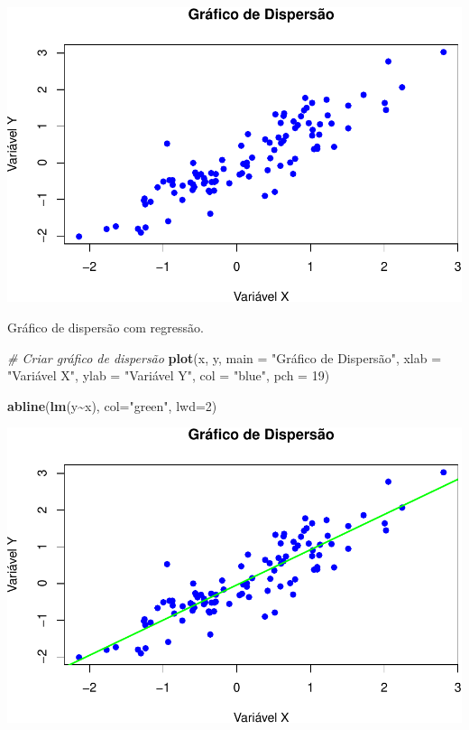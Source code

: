\documentclass[
]{book}
\newenvironment{Shaded}{\begin{snugshade}}{\end{snugshade}}
\newcommand{\AttributeTok}[1]{\textcolor[rgb]{0.13,0.29,0.53}{#1}}
\newcommand{\CommentTok}[1]{\textcolor[rgb]{0.56,0.35,0.01}{\textit{#1}}}
\newcommand{\DecValTok}[1]{\textcolor[rgb]{0.00,0.00,0.81}{#1}}
\newcommand{\FunctionTok}[1]{\textcolor[rgb]{0.13,0.29,0.53}{\textbf{#1}}}
\newcommand{\NormalTok}[1]{#1}
\newcommand{\SpecialCharTok}[1]{\textcolor[rgb]{0.81,0.36,0.00}{\textbf{#1}}}
\newcommand{\StringTok}[1]{\textcolor[rgb]{0.31,0.60,0.02}{#1}}
\begin{document}
\includegraphics{introR_files/figure-latex/unnamed-chunk-182-1.pdf}

Gráfico de dispersão com regressão.

\begin{Shaded}
\begin{Highlighting}[]
\CommentTok{\# Criar gráfico de dispersão}
\FunctionTok{plot}\NormalTok{(x, y, }
     \AttributeTok{main =} \StringTok{"Gráfico de Dispersão"}\NormalTok{, }
     \AttributeTok{xlab =} \StringTok{"Variável X"}\NormalTok{, }
     \AttributeTok{ylab =} \StringTok{"Variável Y"}\NormalTok{, }
     \AttributeTok{col =} \StringTok{"blue"}\NormalTok{, }
     \AttributeTok{pch =} \DecValTok{19}\NormalTok{)}

\FunctionTok{abline}\NormalTok{(}\FunctionTok{lm}\NormalTok{(y}\SpecialCharTok{\textasciitilde{}}\NormalTok{x), }\AttributeTok{col=}\StringTok{"green"}\NormalTok{, }\AttributeTok{lwd=}\DecValTok{2}\NormalTok{)}
\end{Highlighting}
\end{Shaded}

\includegraphics{introR_files/figure-latex/unnamed-chunk-183-1.pdf}
\end{document}
